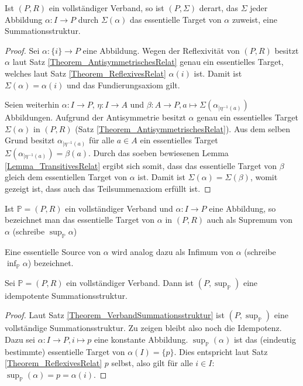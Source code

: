 \documentclass{article}
\begin{document}
\begin{theorem}\label{Theorem_VerbandSummationsstruktur}
  Ist $(P, R)$ ein vollständiger Verband, so ist $(P, \Sigma)$ derart, 
  das $\Sigma$ jeder Abbildung $\alpha \colon I \to P$ durch $\Sigma(\alpha)$ das essentielle Target von $\alpha$ zuweist,
  eine Summationsstruktur.
\end{theorem}
\begin{proof}
  Sei $\alpha \colon \{i\} \to P$ eine Abbildung.
  Wegen der Reflexivität von $(P, R)$ besitzt $\alpha$ laut Satz \ref{Theorem_AntisymmetrischesRelat} genau ein essentielles Target,
  welches laut Satz \ref{Theorem_ReflexivesRelat} $\alpha(i)$ ist.
  Damit ist $\Sigma(\alpha) = \alpha(i)$ und das Fundierungsaxiom gilt.

  Seien weiterhin $\alpha \colon I \to P$, $\eta \colon I \to A$ und  $\beta \colon A \to P, a \mapsto \Sigma(\alpha_{\mid \eta^{-1}(a)})$  Abbildungen.
  Aufgrund der Antisymmetrie besitzt $\alpha$ genau ein essentielles Target $\Sigma(\alpha)$ in $(P, R)$ (Satz \ref{Theorem_AntisymmetrischesRelat}).
  Aus dem selben Grund besitzt $\alpha_{\mid \eta^{-1}(a)}$ für alle $a \in A$ ein essentielles Target $\Sigma(\alpha_{\mid \eta^{-1}(a)}) = \beta(a)$.
  Durch das soeben bewiesenen Lemma \ref{Lemma_TransitivesRelat} ergibt sich somit, 
  dass das essentielle Target von $\beta$ gleich dem essentiellen Target von $\alpha$ ist.
  Damit ist $\Sigma(\alpha) = \Sigma(\beta)$, womit gezeigt ist, dass auch das Teilsummenaxiom erfüllt ist.
\end{proof}

\newpage

\begin{definition}
  Ist $\mathbb{P} = (P, R)$ ein vollständiger Verband und  $\alpha \colon I \to P$ eine Abbildung,
  so bezeichnet man das essentielle Target von $\alpha$ in $(P, R)$ auch 
  als Supremum von $\alpha$ (schreibe $\sup_{\mathbb{P}} \alpha$)
  
  Eine essentielle Source von $\alpha$ wird analog dazu als Infimum von $\alpha$ (schreibe $\inf_{\mathbb{P}} \alpha$) bezeichnet.
\end{definition}

\begin{theorem}
  Sei $\mathbb{P} = (P, R)$ ein vollständiger Verband.
  Dann ist $(P, \sup_{\mathbb{P}})$ eine idempotente Summationsstruktur.
\end{theorem}
\begin{proof}
  Laut Satz \ref{Theorem_VerbandSummationsstruktur} ist $(P, \sup_{\mathbb{P}})$ eine vollständige Summationsstruktur.
  Zu zeigen bleibt also noch die Idempotenz.
  Dazu sei $\alpha \colon I \to P, i \mapsto p$ eine konstante Abbildung.
  $\sup_\mathbb{P}(\alpha)$ ist das (eindeutig bestimmte) essentielle Target von $\alpha(I) = \{p\}$.
  Dies entspricht laut Satz \ref{Theorem_ReflexivesRelat} $p$ selbst, also gilt für alle $i \in I$: $\sup_\mathbb{P}(\alpha) = p = \alpha(i)$.
\end{proof}
\end{document}
